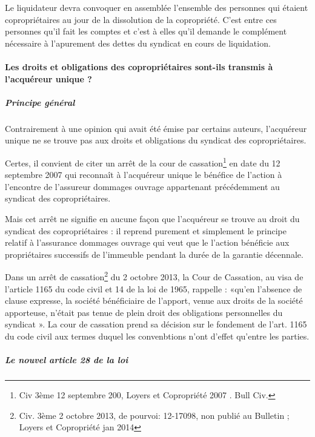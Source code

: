			Le liquidateur devra convoquer en assemblée l’ensemble des personnes qui étaient copropriétaires au jour de la dissolution de la copropriété. C’est entre ces personnes qu’il fait les comptes et c’est à elles qu’il demande le complément nécessaire à l’apurement des dettes du syndicat en cours de liquidation.
			
			\paragraph{Les droits et obligations des copropriétaires sont-ils transmis à l’acquéreur unique ?}
			
				\subparagraph{Principe général}
				
				Contrairement à une opinion qui avait été émise par certains auteurs, l’acquéreur unique ne se trouve pas aux droits et obligations du syndicat des copropriétaires.
			
				Certes, il convient de citer un arrêt de la cour de cassation\footnote{Civ 3ème 12 septembre 200, Loyers et Copropriété 2007 . Bull Civ.} en date du 12 septembre 2007 qui reconnaît à l’acquéreur unique le bénéfice de l’action à l’encontre de l’assureur dommages ouvrage appartenant précédemment au syndicat des copropriétaires.
		
				Mais cet arrêt ne signifie en aucune façon que l’acquéreur se trouve au droit du syndicat des copropriétaires : il reprend purement et simplement le principe relatif à l’assurance dommages ouvrage
				qui veut que le l’action bénéficie aux propriétaires successifs de l’immeuble pendant la durée de la garantie décennale.
				
				Dans un arrêt de cassation\footnote{Civ. 3ème 2 octobre 2013, \no de pourvoi: 12-17098, non publié au Bulletin ; Loyers et Copropriété jan 2014 } du 2 octobre 2013, la Cour de Cassation, au visa de l’article 1165 du code civil et 14 de la loi de 1965, rappelle : «qu’en l'absence de clause expresse, la société bénéficiaire de l'apport, venue aux droits de la société apporteuse, n'était pas tenue de plein droit des obligations personnelles du syndicat ». La cour de cassation prend sa décision sur le fondement de l’art. 1165 du code civil aux termes duquel les convenbtions n’ont d’effet qu’entre les parties.
				
				\subparagraph{Le nouvel article 28 de la loi}
				
